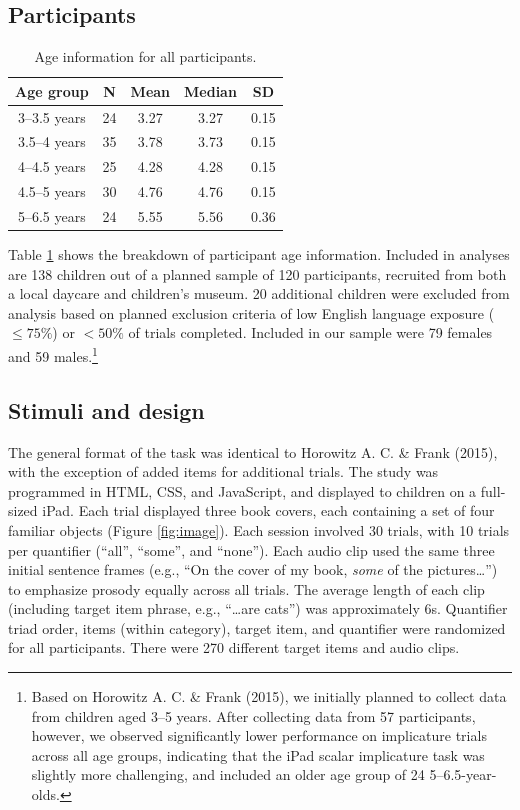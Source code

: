 \documentclass[10pt, letterpaper]{article}
\begin{document}
\subsection{Participants}\label{participants}

\begin{table}[t]
\centering
\begin{tabular}{c c c c c } 
 \hline
 Age group & N & Mean & Median & SD \\
 \hline
 3--3.5 years & 24 & 3.27 & 3.27 & 0.15\\
 3.5--4 years & 35 & 3.78 & 3.73 & 0.15 \\ 
 4--4.5 years & 25 & 4.28 & 4.28 & 0.15\\
 4.5--5 years & 30 & 4.76 & 4.76 & 0.15 \\
 5--6.5 years & 24 & 5.55 & 5.56 & 0.36 \\
 \hline
\end{tabular}
\caption{Age information for all participants.}
\label{tab:age}
\end{table}

Table \ref{tab:age} shows the breakdown of participant age information.
Included in analyses are 138 children out of a planned sample of 120
participants, recruited from both a local daycare and children's museum.
20 additional children were excluded from analysis based on planned
exclusion criteria of low English language exposure (\(\leq 75\%\)) or
\(<50\%\) of trials completed. Included in our sample were 79 females
and 59 males.\footnote{Based on Horowitz A. C. \& Frank (2015), we
  initially planned to collect data from children aged 3--5 years. After
  collecting data from 57 participants, however, we observed
  significantly lower performance on implicature trials across all age
  groups, indicating that the iPad scalar implicature task was slightly
  more challenging, and included an older age group of 24
  5--6.5-year-olds.}

\subsection{Stimuli and design}\label{stimuli-and-design}

The general format of the task was identical to Horowitz A. C. \& Frank
(2015), with the exception of added items for additional trials. The
study was programmed in HTML, CSS, and JavaScript, and displayed to
children on a full-sized iPad. Each trial displayed three book covers,
each containing a set of four familiar objects (Figure \ref{fig:image}).
Each session involved 30 trials, with 10 trials per quantifier (``all'',
``some'', and ``none''). Each audio clip used the same three initial
sentence frames (e.g., ``On the cover of my book, \emph{some} of the
pictures\ldots{}'') to emphasize prosody equally across all trials. The
average length of each clip (including target item phrase, e.g.,
``\ldots{}are cats'') was approximately 6s. Quantifier triad order,
items (within category), target item, and quantifier were randomized for
all participants. There were 270 different target items and audio clips.
\end{document}
